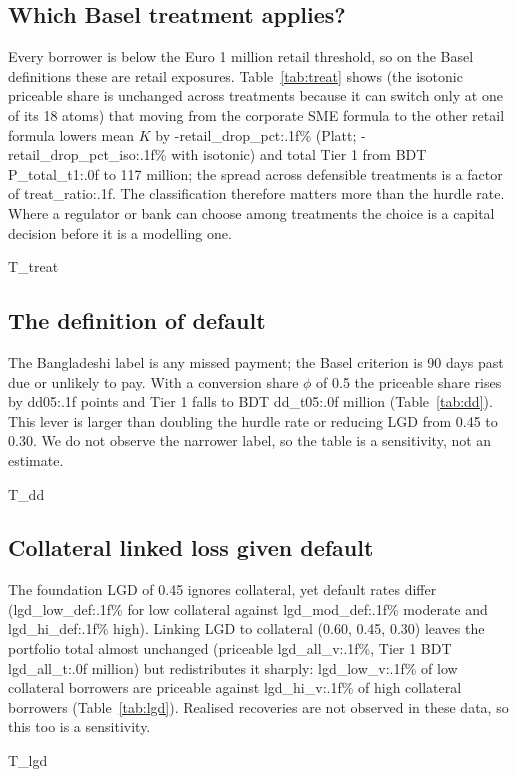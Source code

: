 \documentclass[11pt,a4paper]{article}
\newcommand{\tabsize}{\footnotesize}
\begin{document}
\subsection{Which Basel treatment applies?}
Every borrower is below the Euro 1 million retail threshold, so on the Basel definitions these are retail exposures. Table~\ref{tab:treat} shows (the isotonic priceable share is unchanged across treatments because it can switch only at one of its 18 atoms) that moving from the corporate SME formula to the other retail formula lowers mean $K$ by {{-retail_drop_pct:.1f}}\% (Platt; {{-retail_drop_pct_iso:.1f}}\% with isotonic) and total Tier 1 from BDT {{P_total_t1:.0f}} to 117 million; the spread across defensible treatments is a factor of {{treat_ratio:.1f}}. The classification therefore matters more than the hurdle rate. Where a regulator or bank can choose among treatments the choice is a capital decision before it is a modelling one.
\begin{table}[H]\centering\tabsize\setlength{\tabcolsep}{3pt}\caption{Regulatory treatment, under isotonic and Platt PD. Tier 1 in BDT million.}\label{tab:treat}
{{T_treat}}\end{table}

\subsection{The definition of default}
The Bangladeshi label is any missed payment; the Basel criterion is 90 days past due or unlikely to pay. With a conversion share $\phi$ of 0.5 the priceable share rises by {{dd05:.1f}} points and Tier 1 falls to BDT {{dd_t05:.0f}} million (Table~\ref{tab:dd}). This lever is larger than doubling the hurdle rate or reducing LGD from 0.45 to 0.30. We do not observe the narrower label, so the table is a sensitivity, not an estimate.
\begin{table}[H]\centering\tabsize\caption{Default definition sensitivity (Platt PD, prior shift correction).}\label{tab:dd}
{{T_dd}}\end{table}

\subsection{Collateral linked loss given default}
The foundation LGD of 0.45 ignores collateral, yet default rates differ ({{lgd_low_def:.1f}}\% for low collateral against {{lgd_mod_def:.1f}}\% moderate and {{lgd_hi_def:.1f}}\% high). Linking LGD to collateral (0.60, 0.45, 0.30) leaves the portfolio total almost unchanged (priceable {{lgd_all_v:.1f}}\%, Tier 1 BDT {{lgd_all_t:.0f}} million) but redistributes it sharply: {{lgd_low_v:.1f}}\% of low collateral borrowers are priceable against {{lgd_hi_v:.1f}}\% of high collateral borrowers (Table~\ref{tab:lgd}). Realised recoveries are not observed in these data, so this too is a sensitivity.
\begin{table}[H]\centering\tabsize\setlength{\tabcolsep}{3pt}\caption{Collateral linked LGD (Platt PD).}\label{tab:lgd}
{{T_lgd}}\end{table}
\end{document}
